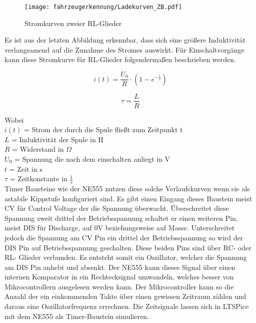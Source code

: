 \begin{figure}[H]
    \centering
    \texttt{[image: fahrzeugerkennung/Ladekurven\_ZB.pdf]}
    \caption{Stromkurven zweier RL-Glieder}
\end{figure}

Es ist aus der letzten Abbildung erkennbar, dass sich eine größere Induktivität verlangsamend auf die Zunahme des Stromes auswirkt. Für Einschaltvorgänge kann diese Stromkurve
für RL-Glieder folgendermaßen beschrieben werden.

\begin{equation} \label{eq:i_L}
    i(t) = \frac{U_{0}}{R} \cdot (1 - e^{-\frac{t}{\tau}})
\end{equation}

\begin{equation} \label{eq:tau_RL}
    \tau = \frac{L}{R}
\end{equation} 

Wobei \\
$i(t)$ = Strom der durch die Spule fließt zum Zeitpunkt t \\
$L$ = Induktivität der Spule in H\\
$R$ = Widerstand in $\Omega$ \\
$U_0$ = Spannung die nach dem einschalten anliegt in V\\
$t$ = Zeit in s \\
$\tau$ = Zeitkonstante in $\frac{1}{s}$\\

Timer Bausteine wie der NE555 nutzen diese solche Verlaufskurven wenn sie als astabile Kippstufe konfiguriert sind.
Es gibt einen Eingang dieses Baustein meist CV für Control Voltage der die Spannung überwacht. Überschreitet diese Spannung zweit drittel
der Betriebsspannung schaltet er einen weiteren Pin, meist DIS für Discharge, auf 0V beziehungsweise auf Masse. Unterschreitet jedoch 
die Spannung am CV Pin ein drittel der Betriebsspannung so wird der DIS Pin auf Betriebsspannung geschalten. Diese beiden Pins 
sind über RC- oder RL- Glieder verbunden. Es entsteht somit ein Oszillator, welcher die Spannung am DIS Pin anhebt und absenkt.
Der NE555 kann dieses Signal über einen internen Komparator in ein Rechtecksignal umwandeln, welches besser von Mikrocontrollern ausgelesen
werden kann. Der Mikrocontroller kann so die Anzahl der ein einkommenden Takte über einen gewissen Zeitraum zählen und daraus eine Oszillatorfrequenz errechnen.
Die Zeitsignale lassen sich in LTSPice mit dem NE555 als Timer-Baustein simulieren.


